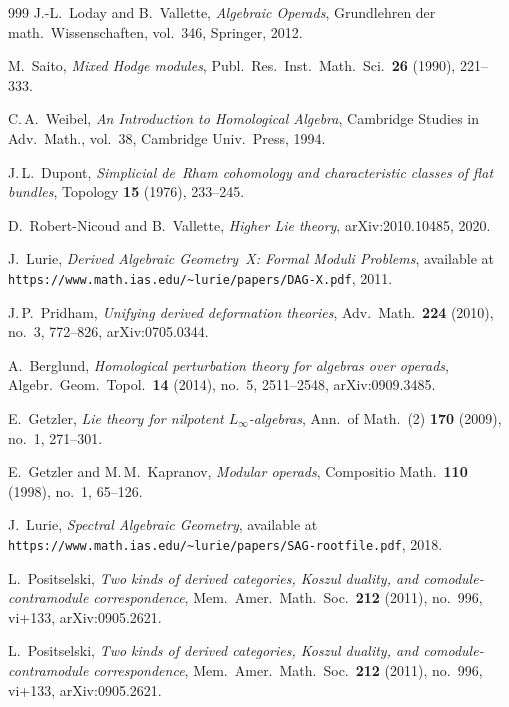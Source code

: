 \documentclass[11pt]{memoir}
\begin{document}
\begin{thebibliography}{999}
J.-L.~Loday and B.~Vallette, \emph{Algebraic Operads}, Grundlehren der math.\ Wissenschaften, vol.~346, Springer, 2012.

M.~Saito, \emph{Mixed Hodge modules}, Publ.\ Res.\ Inst.\ Math.\ Sci.\ \textbf{26} (1990), 221--333.

C.\,A.~Weibel, \emph{An Introduction to Homological Algebra}, Cambridge Studies in Adv.\ Math., vol.~38, Cambridge Univ.\ Press, 1994.

J.\,L.~Dupont, \emph{Simplicial de~Rham cohomology and characteristic classes of flat bundles}, Topology \textbf{15} (1976), 233--245.

D.~Robert-Nicoud and B.~Vallette, \emph{Higher Lie theory}, arXiv:2010.10485, 2020.

J.~Lurie, \emph{Derived Algebraic Geometry~X: Formal Moduli Problems}, available at \texttt{https://www.math.ias.edu/\~{}lurie/papers/DAG-X.pdf}, 2011.

J.\,P.~Pridham, \emph{Unifying derived deformation theories}, Adv.\ Math.\ \textbf{224} (2010), no.~3, 772--826, arXiv:0705.0344.

A.~Berglund, \emph{Homological perturbation theory for algebras over operads}, Algebr.\ Geom.\ Topol.\ \textbf{14} (2014), no.~5, 2511--2548, arXiv:0909.3485.

E.~Getzler, \emph{Lie theory for nilpotent $L_\infty$-algebras}, Ann.\ of Math.\ (2) \textbf{170} (2009), no.~1, 271--301.

E.~Getzler and M.\,M.~Kapranov, \emph{Modular operads}, Compositio Math.\ \textbf{110} (1998), no.~1, 65--126.

J.~Lurie, \emph{Spectral Algebraic Geometry}, available at \texttt{https://www.math.ias.edu/\~{}lurie/papers/SAG-rootfile.pdf}, 2018.


L.~Positselski, \emph{Two kinds of derived categories, Koszul duality, and comodule-contramodule correspondence}, Mem.\ Amer.\ Math.\ Soc.\ \textbf{212} (2011), no.~996, vi+133, arXiv:0905.2621.

L.~Positselski, \emph{Two kinds of derived categories, Koszul duality, and comodule-contramodule correspondence}, Mem.\ Amer.\ Math.\ Soc.\ \textbf{212} (2011), no.~996, vi+133, arXiv:0905.2621.


\end{thebibliography}
\end{document}
